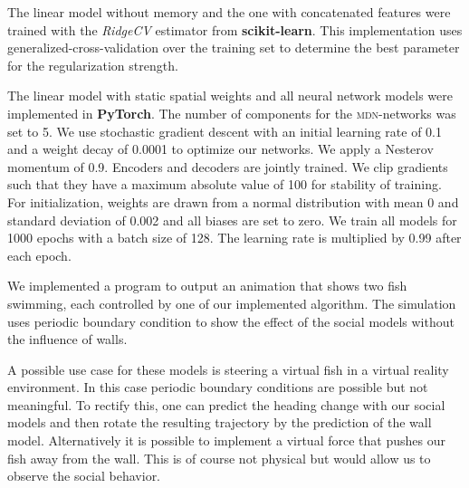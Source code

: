 \documentclass[nobib, a4paper]{tufte-handout}
\begin{document}
The linear model without memory and the one with concatenated features were trained with the \textit{RidgeCV} estimator from \textbf{scikit-learn}\autocite{scikitLearn}.
This implementation uses generalized-cross-validation over the training set to determine the best parameter for the regularization strength.

The linear model with static spatial weights and all neural network models were implemented in \textbf{PyTorch}.
The number of components for the \textsc{mdn}-networks was set to 5.
We use stochastic gradient descent with an initial learning rate of 0.1 and a weight decay of 0.0001 to optimize our networks.
We apply a Nesterov momentum of 0.9.
Encoders and decoders are jointly trained.
We clip gradients such that they have a maximum absolute value of 100 for stability of training.
For initialization, weights are drawn from a normal distribution with mean 0 and standard deviation of 0.002 and all biases are set to zero.
We train all models for 1000 epochs with a batch size of 128.
The learning rate is multiplied by 0.99 after each epoch.

We implemented a program to output an animation that shows two fish swimming, each controlled by one of our implemented algorithm.
The simulation uses periodic boundary condition to show the effect of the social models without the influence of walls.

A possible use case for these models is steering a virtual fish in a virtual reality environment\autocite{animalVr}.
In this case periodic boundary conditions are possible but not meaningful.
To rectify this, one can predict the heading change with our social models and then rotate the resulting trajectory by the prediction of the wall model.
Alternatively it is possible to implement a virtual force that pushes our fish away from the wall.
This is of course not physical but would allow us to observe the social behavior.
\end{document}
